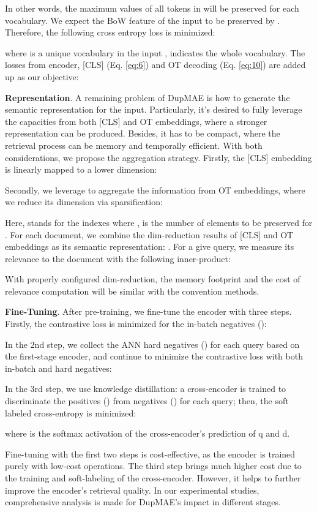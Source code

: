 \documentclass[11pt,a4paper]{article}
\begin{document}
In other words, the maximum values of all tokens in  will be preserved for each vocabulary. We expect the BoW feature of the input to be preserved by . Therefore, the following cross entropy loss  is minimized: 

where  is a unique vocabulary in the input ,  indicates the whole vocabulary. The losses from encoder, [CLS] (Eq. \ref{eq:6}) and OT decoding (Eq. \ref{eq:10}) are added up as our objective: 


\textbf{Representation}. A remaining problem of DupMAE is how to generate the semantic representation for the input. Particularly, it's desired to fully leverage the capacities from both [CLS] and OT embeddings, where a stronger representation can be produced. Besides, it has to be compact, where the retrieval process can be memory and temporally efficient. With both considerations, we propose the aggregation strategy. Firstly, the [CLS] embedding  is linearly mapped to a lower dimension: 

Secondly, we leverage  to aggregate the information from OT embeddings, where we reduce its dimension via sparsification: 

Here,  stands for the indexes where ,  is the number of elements to be preserved for . For each document, we combine the dim-reduction results of [CLS] and OT embeddings as its semantic representation: . For a give query, we measure its relevance to the document with the following inner-product: 
 
With properly configured dim-reduction, the memory footprint and the cost of relevance computation will be similar with the convention methods.  

\textbf{Fine-Tuning}. After pre-training, we fine-tune the encoder with three steps. Firstly, the contrastive loss is minimized for the in-batch negatives (): 

In the 2nd step, we collect the ANN hard negatives () for each query based on the first-stage encoder, and continue to minimize the contrastive loss with both in-batch and hard negatives: 
 
In the 3rd step, we use knowledge distillation: a cross-encoder is trained to discriminate the positives () from negatives () for each query; then, the soft labeled cross-entropy is minimized: 
 
where  is the softmax activation of the cross-encoder's prediction of q and d. 

Fine-tuning with the first two steps is cost-effective, as the encoder is trained purely with low-cost operations. The third step brings much higher cost due to the training and soft-labeling of the cross-encoder. However, it helps to further improve the encoder's retrieval quality. In our experimental studies, comprehensive analysis is made for DupMAE's impact in different stages. 
\end{document}
